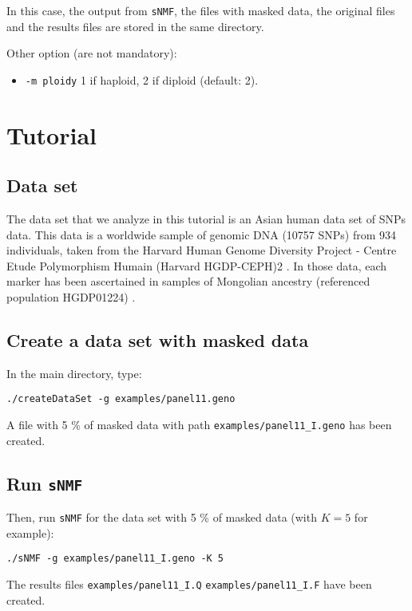 \documentclass[10pt,a4paper]{article}
\begin{document}
\begin{itemize}
In this case, the output from {\tt sNMF}, the files with masked data, the original files and the results files 
are stored in the same directory.

\noindent
Other option (are not mandatory):
\begin{itemize}
\item \verb|-m ploidy|  1 if haploid, 2 if diploid (default: 2). 
\end{itemize}

\end{itemize}

\section{Tutorial}

\subsection{Data set}
The data set that we analyze in this tutorial is an Asian human data set of SNPs data.
This data is a worldwide sample of genomic DNA (10757 SNPs) from 934 individuals,
taken from the Harvard Human Genome Diversity Project - Centre
Etude Polymorphism Humain (Harvard HGDP-CEPH)2 . 
In those data, each marker has been ascertained in samples of Mongolian
ancestry (referenced population HGDP01224) \cite{Patterson_2012}. 

\subsection{Create a data set with masked data}

In the main directory, type:
\begin{Verbatim}[frame=single]
./createDataSet -g examples/panel11.geno
\end{Verbatim}

\noindent
A file with 5 \% of masked data with path \verb|examples/panel11_I.geno| has been created.

\subsection{Run {\tt sNMF}}

Then, run {\tt sNMF} for the data set with 5 \% of masked data (with $K=5$ for example):
\begin{Verbatim}[frame=single]
./sNMF -g examples/panel11_I.geno -K 5
\end{Verbatim}

\noindent
The results files \verb|examples/panel11_I.Q| \verb|examples/panel11_I.F| have been created.
\end{document}
